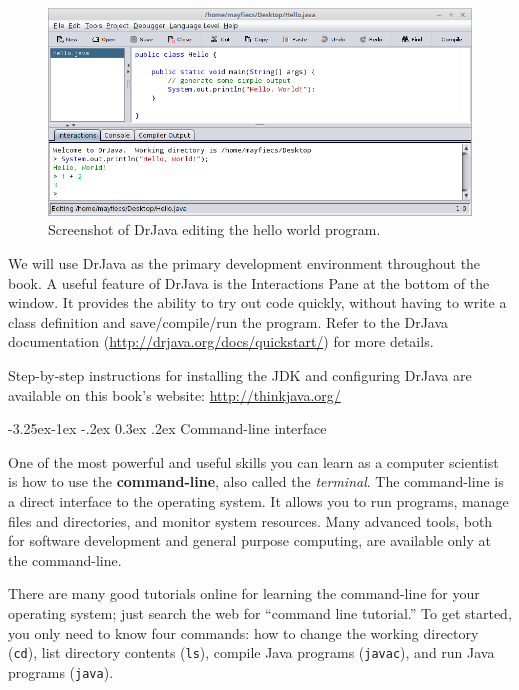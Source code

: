\documentclass[12pt]{book}
\makeatletter
\renewcommand\subsection{\@startsection{subsection}{2}{\z@}%
    {-3.25ex\@plus -1ex \@minus -.2ex}%
    {0.3ex \@plus .2ex}%
    {\normalfont\large\bfseries}}
\theoremstyle{exercise}
\makeatother
\begin{document}
\begin{figure}[!h]
\begin{center}
\includegraphics[width=\textwidth]{figs/drjava-hello.png}
\caption{Screenshot of DrJava editing the hello world program.}
\end{center}
\end{figure}


We will use DrJava as the primary development environment throughout the book.
A useful feature of DrJava is the Interactions Pane at the bottom of the window.
It provides the ability to try out code quickly, without having to write a class definition and save/compile/run the program.
Refer to the DrJava documentation (\url{http://drjava.org/docs/quickstart/}) for more details.

Step-by-step instructions for installing the JDK and configuring DrJava are available on this book's website: \url{http://thinkjava.org/}


\subsection{Command-line interface}


One of the most powerful and useful skills you can learn as a computer scientist is how to use the {\bf command-line}, also called
the {\em terminal}.
The command-line is a direct interface to the operating system.
It allows you to run programs, manage files and directories, and monitor system resources.
Many advanced tools, both for software development and general purpose computing, are available only at the command-line.

There are many good tutorials online for learning the command-line for your operating system; just search the web for ``command line tutorial.''
To get started, you only need to know four commands: how to change the working directory ({\tt cd}), list directory contents ({\tt ls}), compile Java programs ({\tt javac}), and run Java programs ({\tt java}).
\end{document}
